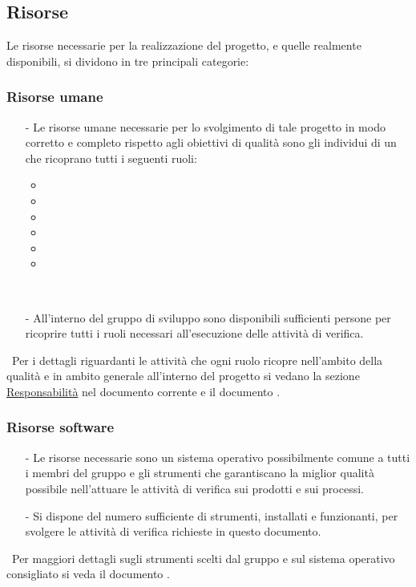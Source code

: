 \documentclass[a4paper, titlepage]{article}
\begin{document}
\newpage 
\subsection{Risorse}
Le risorse necessarie per la realizzazione del progetto, e quelle realmente disponibili, si dividono in tre principali categorie:
\subsubsection{Risorse umane}
\begin{itemize}
\item[-] 
\newline Le risorse umane necessarie per lo svolgimento di tale progetto in modo corretto e completo rispetto agli obiettivi di qualità sono gli individui di un  che ricoprano tutti i seguenti ruoli:
\begin{itemize}
\item {}
\item {}
\item {}
\item {}
\item {}
\item {}
\end{itemize}
\ 
\item[-] 
\newline All'interno del gruppo di sviluppo sono disponibili sufficienti persone per ricoprire tutti i ruoli necessari all'esecuzione delle attività di verifica.
\end{itemize}
\
\newline Per i dettagli riguardanti le attività che ogni ruolo ricopre nell'ambito della qualità e in ambito generale all'interno del progetto si vedano la sezione \hyperref[sec:repo]{Responsabilità} nel documento corrente e il documento . 

\subsubsection{Risorse software}
\begin{itemize}
\item[-] 
\newline Le risorse  necessarie sono un sistema operativo possibilmente comune a tutti i membri del gruppo e gli strumenti che garantiscano la miglior qualità possibile nell'attuare le attività di verifica sui prodotti e sui processi. 
\ 
\item[-] 
\newline  Si dispone del numero sufficiente di strumenti, installati e funzionanti, per svolgere le attività di verifica richieste in questo documento.
\end{itemize}
\ 
\newline Per maggiori dettagli sugli strumenti scelti dal gruppo e sul sistema operativo consigliato si veda il documento .
\end{document}
